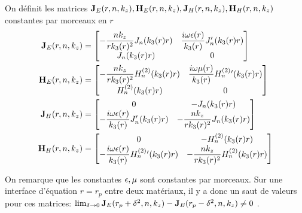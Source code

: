   \begin{defn}
    \label{def:cylindre:JE-JH-HE-HH}
    On définit les matrices \(\mathbf{J}_{E}(r,n,k_z),\mathbf{H}_{E}(r,n,k_z),\mathbf{J}_{H}(r,n,k_z),\mathbf{H}_{H}(r,n,k_z)\) constantes par morceaux en \(r\)
    \begin{align*}
      \mathbf{J}_{E}(r,n,k_z) &=
      \begin{bmatrix}
        -\dfrac{nk_z}{rk_3(r)^2}J_n(k_3(r)r) & \dfrac{i\omega\epsilon(r)}{k_3(r)}J_n'(k_3(r)r)
        \\
        J_n(k_3(r)r) & 0
      \end{bmatrix}
      \\
      \mathbf{H}_{E}(r,n,k_z) &=
      \begin{bmatrix}
        -\dfrac{nk_z}{rk_3(r)^2}H_n^{(2)}(k_3(r)r) & \dfrac{i\omega\mu(r)}{k_3(r)}H_n^{(2)}{}'(k_3(r)r)
        \\
        H_n^{(2)}(k_3(r)r) & 0
      \end{bmatrix}
      \\
      \mathbf{J}_{H}(r,n,k_z) &=
      \begin{bmatrix}
        0 & -J_n(k_3(r)r)
        \\
        -\dfrac{i\omega\epsilon(r)}{k_3(r)}J_n'(k_3(r)r) & -\dfrac{nk_z}{rk_3(r)^2}J_n(k_3(r)r)
      \end{bmatrix}
      \\
      \mathbf{H}_{H}(r,n,k_z) &=
      \begin{bmatrix}
        0 & -H_n^{(2)}(k_3(r)r)
        \\
        -\dfrac{i\omega\epsilon(r)}{k_3(r)}H_n^{(2)}{}'(k_3(r)r) & -\dfrac{nk_z}{rk_3(r)^2}H_n^{(2)}(k_3(r)r)
      \end{bmatrix}
    \end{align*}
  \end{defn}

  On remarque que les constantes \(\epsilon,\mu\) sont constantes par morceaux. Sur une interface d'équation \(r=r_p\) entre deux matériaux, il y a donc un saut de valeurs pour ces matrices: \(\lim_{\delta\rightarrow 0 } \mathbf{J}_E(r_p+ \delta^2,n,k_z) - \mathbf{J}_E(r_p - \delta^2,n,k_z) \not = 0\) .

